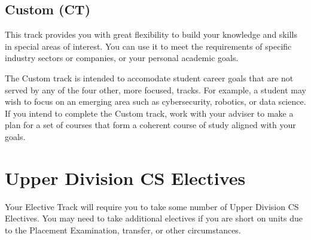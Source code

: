 \documentclass{book}
\newcommand{\CtTrackName}{Custom (CT)}
\begin{document}
\subsection{\CtTrackName}
\CtTrackIndex

This track provides you with great flexibility to build your knowledge and skills in special areas of interest. You can use it to meet the requirements of specific industry sectors or companies, or your personal academic goals.

The Custom track is intended to accomodate student career goals that are not served by any of the four other, more focused, tracks. For example, a student may wish to focus on an emerging area such as cybersecurity, robotics, or data science. If you intend to complete the Custom track, work with your adviser to make a plan for a set of courses that form a coherent course of study aligned with your goals.

\section{Upper Division CS Electives}
\label{section:upper_division_cs_electives}

Your Elective Track will require you to take some number of Upper Division CS Electives. You may need to take additional electives if you are short on units due to the Placement Examination, transfer, or other circumstances.
\end{document}
